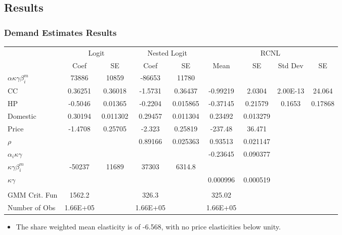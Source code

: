 \documentclass{beamer}
\begin{document}
\subsection{Results}
\begin{frame}[fragile]\frametitle{Demand Estimates Results}

\tiny
\resizebox{\linewidth}{!} {%
    \begin{tabular}{lcccccccc}
    \toprule
          & \multicolumn{2}{c}{Logit} & \multicolumn{2}{c}{Nested Logit} & \multicolumn{4}{c}{RCNL} \\
    
          & Coef  & SE    & Coef  & SE    & Mean  & SE    & Std Dev & SE \\
    \midrule
    $\alpha \kappa \gamma \beta_{i}^{m}$ & 73886 & 10859 & -86653 & 11780 &       &       &       &  \\
    CC    & 0.36251 & 0.36018 & -1.5731 & 0.36437 & -0.99219 & 2.0304 & 2.00E-13 & 24.064 \\
    HP    & -0.5046 & 0.01365 & -0.2204 & 0.015865 & -0.37145 & 0.21579 & 0.1653 & 0.17868 \\
    Domestic & 0.30194 & 0.011302 & 0.29457 & 0.011304 & 0.23492 & 0.013279 &       &  \\
    Price & -1.4708 & 0.25705 & -2.323 & 0.25819 & -237.48 & 36.471 &       &  \\
    $\rho$      &       &       & 0.89166 & 0.025363 & 0.93513 & 0.021147 &       &  \\
\midrule
    $\alpha_{i} \kappa \gamma$      &       &       &       &       & -0.23645 & 0.090377 &       &  \\
    $\kappa \gamma \beta_{i}^{m}$      & -50237 & 11689 & 37303 & 6314.8 &       &       &       &  \\
    $\kappa \gamma$      &       &       &       &       & 0.000996 & 0.000519 &       &  \\
          &       &       &       &       &       &       &       &  \\
    \midrule      
    GMM Crit. Fun & 1562.2 &       & 326.3 &       & 325.02 &       &       &  \\
    Number of Obs & 1.66E+05 &       & 1.66E+05 &       & 1.66E+05 &       &       &  \\
    \bottomrule
    \end{tabular}}
    
\begin{itemize}
    \item The share weighted mean elasticity is of -6.568, with no price elasticities below unity.
\end{itemize}

\end{frame}
\end{document}
